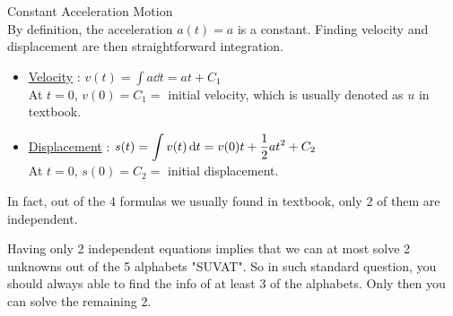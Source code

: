 \documentclass[class=article, crop=false, 12pt]{standalone}
\begin{document}
\begin{example} Constant Acceleration Motion \\

    By definition, the acceleration $a(t) = a$ is a constant. 
    Finding velocity and displacement are then straightforward integration.

    \begin{itemize}
        \item \ul{Velocity} : $v(t) = \displaystyle \int a \dd{t} = at + C_1$ \\[0.5em]
        At $t=0$, $v(0) = C_1 =$ initial velocity, which is usually denoted as $u$ in textbook.

        \item \ul{Displacement} : $s(t) = \displaystyle \int v(t) \dd{t} = v(0)t + \frac{1}{2} at^2 + C_2$ \\[0.5em]
        At $t=0$, $s(0) = C_2 =$ initial displacement.
    \end{itemize}
    
    In fact, out of the 4 formulas we usually found in textbook, only 2 of them are independent.

    Having only 2 independent equations implies that we can at most solve 2 unknowns out of the 5 alphabets "SUVAT".
    So in such standard question, you should always able to find the info of at least 3 of the alphabets.
    Only then you can solve the remaining 2. 

\end{example}
\end{document}

